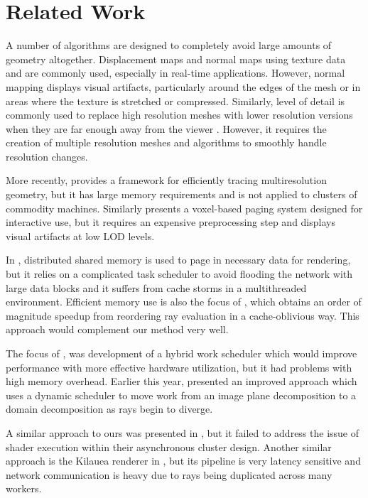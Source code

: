 \documentclass[a4paper,twoside]{article}
\begin{document}
\section{Related Work}
\label{relatedwork}

A number of algorithms are designed to completely avoid large amounts of
geometry altogether. Displacement maps \cite{krishnamurthy:1996} and normal
maps using texture data \cite{cohen:1998} and \cite{cignoni:1998} are commonly
used, especially in real-time applications. However, normal mapping displays
visual artifacts, particularly around the edges of the mesh or in areas where the texture is
stretched or compressed. Similarly, level of detail is commonly used to replace
high resolution meshes with lower resolution versions when they are far enough
away from the viewer \cite{clark:1976}. However, it requires the creation of
multiple resolution meshes and algorithms to smoothly handle resolution changes.

More recently, \cite{djeu:2011} provides a framework for efficiently tracing
multiresolution geometry, but it has large memory requirements and is not
applied to clusters of commodity machines. Similarly \cite{afra:2012} presents
a voxel-based paging system designed for interactive use, but it requires an
expensive preprocessing step and displays visual artifacts at low LOD levels.

In \cite{demarle:2004}, distributed shared memory is used to page in necessary
data for rendering, but it relies on a complicated task scheduler to avoid
flooding the network with large data blocks and it suffers from cache storms in
a multithreaded environment. Efficient memory use is also the focus of
\cite{moon:2010}, which obtains an order of magnitude speedup from reordering
ray evaluation in a cache-oblivious way. This approach would complement our
method very well.

The focus of \cite{reinhard:1999}, was development of a hybrid work scheduler which
would improve performance with more effective hardware utilization, but it had
problems with high memory overhead. Earlier this year, \cite{navratil:2012}
presented an improved approach which uses a dynamic scheduler to move work from
an image plane decomposition to a domain decomposition as rays begin to diverge.

A similar approach to ours was presented in \cite{badouel:1994}, but it failed
to address the issue of shader execution within their asynchronous cluster design.
Another similar approach is the Kilauea renderer in \cite{kato:2002}, but its
pipeline is very latency sensitive and network communication is heavy due to
rays being duplicated across many workers.
\end{document}
